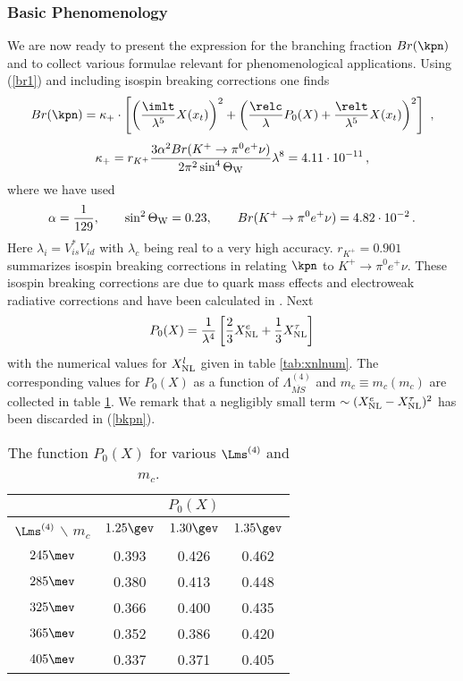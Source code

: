 \subsubsection{Basic Phenomenology}
We are now ready to present the expression for the branching fraction
$Br(\kpn)$ and to collect various formulae relevant for phenomenological
applications.
Using (\ref{br1}) 
and including isospin breaking corrections one finds
\begin{equation}\label{bkpn}
Br(\kpn)=\kappa_+\cdot\left[\left({\imlt\over\lambda^5}X(x_t)\right)^2+
\left({\relc\over\lambda}P_0(X)+{\relt\over\lambda^5}X(x_t)\right)^2
\right]~,
\end{equation}
\begin{equation}\label{kapp}
\kappa_+=r_{K^+}{3\alpha^2 Br(K^+\to\pi^0e^+\nu)\over 2\pi^2
\sin^4\Theta_{\rm W}}
 \lambda^8=4.11\cdot 10^{-11}\,,
\end{equation}
where we have used
\begin{equation}\label{alsinbr}
\alpha=\frac{1}{129},\qquad \sin^2\Theta_{\rm W}=0.23, \qquad
Br(K^+\to\pi^0e^+\nu)=4.82\cdot 10^{-2}\,.
\end{equation}
Here $\lambda_i=V^\ast_{is}V_{id}$ with $\lambda_c$ being
real to a very high accuracy. $r_{K^+}=0.901$ summarizes isospin
breaking corrections in relating $\kpn$ to $K^+\to\pi^0e^+\nu$.
These isospin breaking corrections are due to quark mass effects and 
electroweak radiative corrections and have been calculated in
\cite{MP}. Next
\begin{equation}\label{p0k}
P_0(X)=\frac{1}{\lambda^4}\left[\frac{2}{3} X^e_{\rm NL}+\frac{1}{3}
 X^\tau_{\rm NL}\right]
\end{equation}
with the numerical values for $X_{\rm NL}^l$ given in table \ref{tab:xnlnum}.
The corresponding values for $P_0(X)$ as a function of
$\Lambda^{(4)}_{\overline{MS}}$ and $m_c\equiv m_c(m_c)$ 
are collected in
table \ref{tab:P0Kplus}. We remark that a negligibly small term
$\sim (X^e_{\rm NL}-X^{\tau}_{\rm NL})^2 $ has been discarded in
(\ref{bkpn}).

\begin{table}[htb]
\caption[]{The function $P_0(X)$ for various $\Lms^{(4)}$ and $m_c$.
\label{tab:P0Kplus}}
\begin{center}
\begin{tabular}{|c|c|c|c|}
\hline
&\multicolumn{3}{c|}{$P_0(X)$}\\
\hline
$\Lms^{(4)}$ $\backslash$ $m_c$ & $1.25\gev$ & $1.30\gev$ & $1.35\gev$  \\
\hline
$245\mev$ & 0.393 & 0.426 & 0.462 \\
$285\mev$ & 0.380 & 0.413 & 0.448 \\
$325\mev$ & 0.366 & 0.400 & 0.435 \\
$365\mev$ & 0.352 & 0.386 & 0.420 \\
$405\mev$ & 0.337 & 0.371 & 0.405 \\ 
\hline
\end{tabular}
\end{center}
\end{table}

